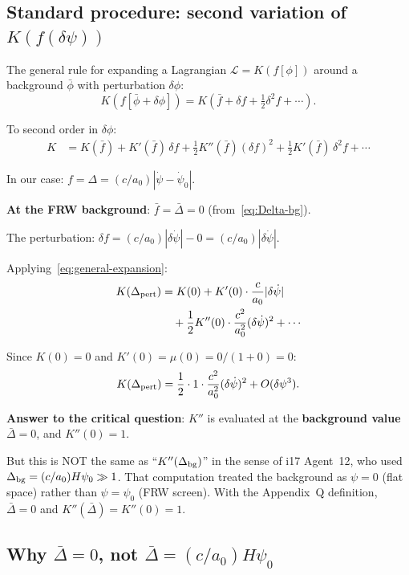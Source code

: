 \documentclass[aps,prd,twocolumn,nofootinbib]{revtex4-2}
\newcommand{\aM}{a_0}
\newcommand{\dpsi}{\delta\psi}
\begin{document}
\subsection{Standard procedure: second variation of $K(f(\dpsi))$}

The general rule for expanding a Lagrangian $\mathcal{L} = K(f[\phi])$
around a background $\bar\phi$ with perturbation $\delta\phi$:
\begin{equation}
K(f[\bar\phi + \delta\phi]) = K(\bar{f} + \delta f + \tfrac{1}{2}\delta^2 f + \cdots).
\end{equation}

To second order in $\delta\phi$:
\begin{align}
K &= K(\bar{f}) + K'(\bar{f})\,\delta f
+ \frac{1}{2}K''(\bar{f})(\delta f)^2
+ \frac{1}{2}K'(\bar{f})\,\delta^2 f + \cdots
\label{eq:general-expansion}
\end{align}

In our case: $f = \Delta = (c/\aM)|\dot\psi - \dot\psi_0|$.

\textbf{At the FRW background}: $\bar{f} = \bar\Delta = 0$
(from~\eqref{eq:Delta-bg}).

The perturbation: $\delta f = (c/\aM)|\delta\dot\psi| - 0
= (c/\aM)|\delta\dot\psi|$.

Applying~\eqref{eq:general-expansion}:
\begin{align}
K(\Delta_{\rm pert}) &= K(0) + K'(0)\cdot\frac{c}{\aM}|\delta\dot\psi|
\notag\\
&\quad+ \frac{1}{2}K''(0)\cdot\frac{c^2}{\aM^2}(\delta\dot\psi)^2 + \cdots
\end{align}

Since $K(0) = 0$ and $K'(0) = \mu(0) = 0/(1+0) = 0$:
\begin{equation}
K(\Delta_{\rm pert}) = \frac{1}{2}\cdot 1 \cdot \frac{c^2}{\aM^2}(\delta\dot\psi)^2
+ O(\dpsi^3).
\end{equation}

\textbf{Answer to the critical question}: $K''$ is evaluated at the
\textbf{background value} $\bar\Delta = 0$, and $K''(0) = 1$.

But this is NOT the same as ``$K''(\Delta_{\rm bg})$'' in the sense of
i17 Agent~12, who used $\Delta_{\rm bg} = (c/\aM)H\psi_0 \gg 1$.
That computation treated the background as $\psi = 0$ (flat space)
rather than $\psi = \psi_0$ (FRW screen). With the Appendix~Q definition,
$\bar\Delta = 0$ and $K''(\bar\Delta) = K''(0) = 1$.

\subsection{Why $\bar\Delta = 0$, not $\bar\Delta = (c/\aM)H\psi_0$}
\end{document}
